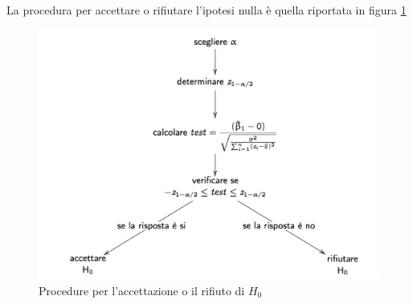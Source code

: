 La procedura per accettare o rifiutare l'ipotesi nulla è quella riportata in figura \ref{fig:ipotesi-1}


\begin{figure}[htbp]
	\centering
	\includegraphics[width = .8\textwidth]{./notes/immagini/l5-fig3-1.png}
	\caption{Procedure per l'accettazione o il rifiuto di $ H_0 $}\label{fig:ipotesi-1}
\end{figure}


